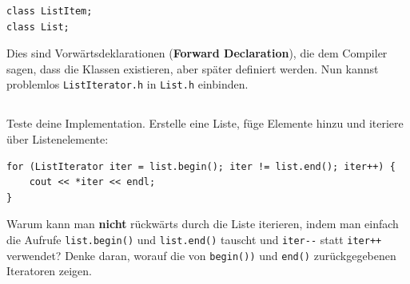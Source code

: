 \begin{lstlisting}
class ListItem;
class List;
\end{lstlisting}

Dies sind Vorwärtsdeklarationen (\textbf{Forward Declaration}), die dem Compiler sagen, dass die Klassen existieren, aber später definiert werden. Nun kannst problemlos \texttt{ListIterator.h} in \texttt{List.h} einbinden.

\subsection{}
Teste deine Implementation.
Erstelle eine Liste, füge Elemente hinzu und iteriere über Listenelemente:

\begin{lstlisting}
for (ListIterator iter = list.begin(); iter != list.end(); iter++) {
	cout << *iter << endl;
}
\end{lstlisting}

Warum kann man \textbf{nicht} rückwärts durch die Liste iterieren, indem man einfach die Aufrufe \texttt{list.begin()} und \texttt{list.end()} tauscht und \texttt{iter-{}-} statt \texttt{iter++} verwendet?
Denke daran, worauf die von \texttt{begin())} und \texttt{end()} zurückgegebenen Iteratoren zeigen.

